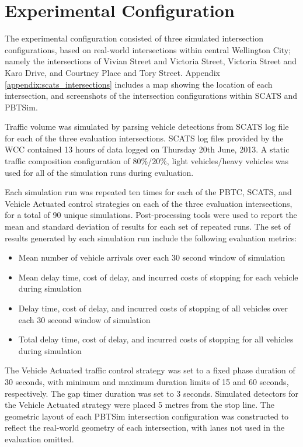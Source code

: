 \section{Experimental Configuration}

The experimental configuration consisted of three simulated intersection configurations, based on real-world intersections within central Wellington City; namely the intersections of Vivian Street and Victoria Street, Victoria Street and Karo Drive, and Courtney Place and Tory Street. Appendix \ref{appendix:scats_intersections} includes a map showing the location of each intersection, and screenshots of the intersection configurations within SCATS and PBTSim. 

Traffic volume was simulated by parsing vehicle detections from SCATS log file for each of the three evaluation intersections. SCATS log files provided by the WCC contained 13 hours of data logged on Thursday 20th June, 2013. A static traffic composition configuration of 80\%/20\%, light vehicles/heavy vehicles was used for all of the simulation runs during evaluation.

Each simulation run was repeated ten times for each of the PBTC, SCATS, and Vehicle Actuated control strategies on each of the three evaluation intersections, for a total of 90 unique simulations. Post-processing tools were used to report the mean and standard deviation of results for each set of repeated runs. The set of results generated by each simulation run include the following evaluation metrics:

\begin{itemize}
\item Mean number of vehicle arrivals over each 30 second window of simulation
\item Mean delay time, cost of delay, and incurred costs of stopping for each vehicle during simulation
\item Delay time, cost of delay, and incurred costs of stopping of all vehicles over each 30 second window of simulation
\item Total delay time, cost of delay, and incurred costs of stopping for all vehicles during simulation
\end{itemize}

The Vehicle Actuated traffic control strategy was set to a fixed phase duration of 30 seconds, with minimum and maximum duration limits of 15 and 60 seconds, respectively. The gap timer duration was set to 3 seconds. Simulated detectors for the Vehicle Actuated strategy were placed 5 metres from the stop line. The geometric layout of each PBTSim intersection configuration was constructed to reflect the real-world geometry of each intersection, with lanes not used in the evaluation omitted. 

